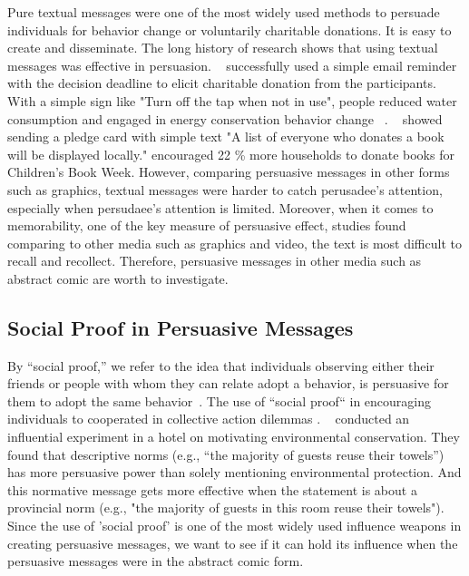 Pure textual messages were one of the most widely used methods to persuade individuals for behavior change or voluntarily charitable donations. It is easy to create and disseminate. The long history of research shows that using textual messages was effective in persuasion. ~\textcite{damgaard2017now} successfully used a simple email reminder with the decision deadline to elicit charitable donation from the participants. With a simple sign like "Turn off the tap when not in use", people reduced water consumption and engaged in energy conservation behavior change ~\cite{mckenzie2011fostering}. ~\textcite{cotterill2010impact} showed sending a pledge card with simple text "A list of everyone who donates a book will be displayed locally." encouraged 22 \% more households to donate books for Children's Book Week. However, comparing persuasive messages in other forms such as graphics, textual messages were harder to catch perusadee's attention, especially when persudaee's attention is limited. Moreover, when it comes to memorability, one of the key measure of persuasive effect, studies found comparing to other media such as graphics and video, the text is most difficult to recall and recollect. Therefore, persuasive messages in other media such as abstract comic are worth to investigate. 


\subsection{Social Proof in Persuasive Messages }
By ``social proof,'' we refer to the idea that individuals observing either their friends or people with whom they can relate adopt a behavior, is persuasive for them to adopt the same behavior~\cite{Cialdini1993, Cialdini2004}. The use of ``social proof`` in encouraging individuals to cooperated in collective action dilemmas \cite{goldstein2008room,schultz2007constructive}. ~\textcite{goldstein2008room} conducted an influential experiment in a hotel on motivating environmental conservation. They found that descriptive norms (e.g., ``the majority of guests reuse their towels'') has more persuasive power than solely mentioning environmental protection. And this normative message gets more effective when the statement is about a provincial norm (e.g., "the majority of guests in this room reuse their towels"). Since the use of 'social proof' is one of the most widely used influence weapons in creating persuasive messages, we want to see if it can hold its influence when the persuasive messages were in the abstract comic form. 


